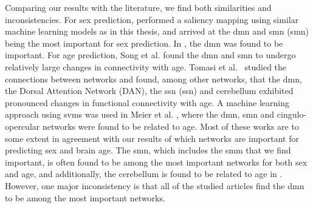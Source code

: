Comparing our results with the literature, we find both similarities and inconsistencies. For sex prediction, \cite{understanding_gnn} performed a saliency mapping using similar machine learning models as in this thesis, and arrived at the \acrshort{dmn} and \acrlong{smn} (\acrshort{smn}) being the most important for sex prediction. In \cite{arslan}, the \acrshort{dmn} was found to be important. For age prediction, Song et al. \cite{song_reorganizational} found the \acrshort{dmn} and \acrshort{smn} to undergo relatively large changes in connectivity with age. Tomasi et al.\ \cite{tomasi_aging} studied the connections between networks and found, among other networks, that the \acrshort{dmn}, the Dorsal Attention Network (DAN), the \acrlong{ssn} (\acrshort{ssn}) and cerebellum exhibited pronounced changes in functional connectivity with age. A machine learning approach using \acrshort{svm}s was used in Meier et al. \cite{meier_svm}, where the \acrshort{dmn}, \acrshort{smn} and cingulo-opercular networks were found to be related to age. Most of these works are to some extent in agreement with our results of which networks are important for predicting sex and brain age. The \acrshort{smn}, which includes the \acrshort{smm} that we find important, is often found to be among the most important networks for both sex and age, and additionally, the cerebellum is found to be related to age in \cite{tomasi_aging}. However, one major inconsistency is that all of the studied articles find the \acrshort{dmn} to be among the most important networks. 

